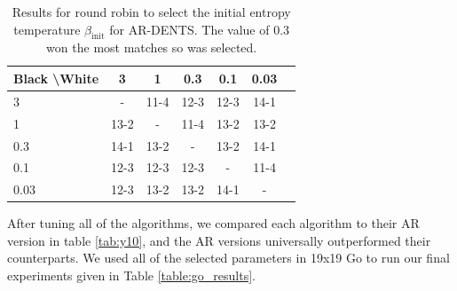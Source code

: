     \begin{table}[]
    \centering
        \begin{tabular}{l|cccccc}
            \textbf{Black \textbackslash White}     & 3  & 1   & 0.3   & 0.1    & 0.03    \\ 
            \hline
                                    3            & - & 11-4 & 12-3 & 12-3 & 14-1  		\\
                                    1            & 13-2 & - & 11-4 & 13-2 & 13-2  		\\
                                    0.3            & 14-1 & 13-2 & - & 13-2 & 14-1  		\\
                                    0.1            & 12-3 & 12-3 & 12-3 & - & 11-4  		\\
                                    0.03            & 12-3 & 13-2 & 13-2 & 14-1 &  - 		\\
        \end{tabular}
        \caption{Results for round robin to select the initial entropy temperature $\beta_{\text{init}}$ for AR-DENTS. The value of 0.3 won the most matches so was selected. \label{tab:x070}}
    \end{table}
    
    
    
    
    
    
    
    After tuning all of the algorithms, we compared each algorithm to their AR version in table \ref{tab:y10}, and the AR versions universally outperformed their counterparts. We used all of the selected parameters in 19x19 Go to run our final experiments given in Table \ref{table:go_results}.
    
    
    
